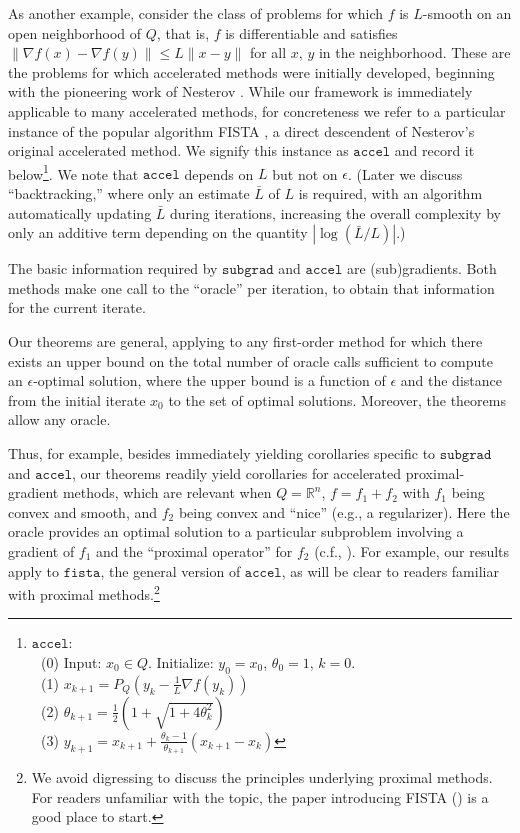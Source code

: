 \documentclass[reqno, 11pt]{amsart}
\numberwithin{equation}{section}
\newcommand{\shrink}[1]{ {\scriptstyle {\textstyle {#1} } } }
\newcommand{\smfrac}[2]{ \shrink{ \frac{#1}{#2} } }
\newcommand{\subgrad}{\mathtt{subgrad}}
\newcommand{\accel}{\mathtt{accel}}
\newcommand{\grad}{\nabla}
\begin{document}
As another example, consider the class of problems for which $ f $ is $ L $-smooth on an open neighborhood of $ Q $, that is, $ f $ is differentiable and satisfies $ \| \grad f(x) -\grad f(y) \| \leq L \| x - y \| $ for all $ x $, $ y $ in the neighborhood. These are the problems for which accelerated methods were initially developed, beginning with the pioneering work of Nesterov \cite{nesterov1983method}. While our framework is immediately applicable to many accelerated methods, for concreteness we refer to a particular instance of the popular algorithm FISTA \cite{beck2009fast}, a direct descendent of Nesterov's original accelerated method. We signify this instance as $ \accel $ and record it below\footnote{$ \accel $: \\ $ \textrm{~} $ \qquad (0)  Input: $ x_0 \in Q $. Initialize: $ y_0 = x_0 $, $ \theta_0 = 1 $, $ k = 0 $. \\
$ \textrm{~} $ \qquad (1) $ x_{k+1} = P_Q( y_k - \smfrac{1}{L}  \grad f(y_k)) $ \\
$ \textrm{~} $ \qquad (2) $ \theta_{k+1} = \smfrac{1}{2} (1 + \sqrt{1 + 4 \theta_k^2}) $ \\
$ \textrm{~} $ \qquad (3) $ y_{k+1} = x_{k+1} + \smfrac{\theta_k - 1}{\theta_{k+1}} (x_{k+1} - x_k) $ }. We note that $ \accel $  depends on $ L $ but not on $ \epsilon $. (Later we discuss ``backtracking,'' where only an estimate $ \bar{L} $ of $ L $ is required, with an algorithm automatically updating $ \bar{L} $ during iterations, increasing the overall complexity by only an additive term depending on the quantity $ | \log( \bar{L}/L ) | $.)  

The basic information required by $ \subgrad $ and $ \accel $ are (sub)gradients. Both methods make one call to the ``oracle'' per iteration, to obtain that information for the current iterate. 

Our theorems are general, applying to any first-order method for which there exists an upper bound on the total number of oracle calls sufficient to compute an $ \epsilon $-optimal solution, where the upper bound is a function of $ \epsilon $ and the distance from the initial iterate $ x_0 $ to the set of optimal solutions.  Moreover, the theorems allow any oracle. 

Thus, for example, besides immediately yielding corollaries specific to $ \subgrad $ and $ \accel $, our theorems readily yield corollaries for accelerated proximal-gradient methods, which are relevant when $ Q = \mathbb{R}^n $, $ f = f_1 + f_2 $ with $ f_1 $ being convex and smooth, and $ f_2 $ being convex and ``nice'' (e.g., a regularizer). Here the oracle provides an optimal solution to a particular subproblem involving a gradient of $ f_1 $ and the ``proximal operator'' for $ f_2 $ (c.f., \cite{nesterov2013gradient}). For example, our results apply to $ \mathtt{fista} $, the general version of $ \accel $, as will be clear to readers familiar with proximal methods.\footnote{We avoid digressing to discuss the principles underlying proximal methods.  For readers unfamiliar with the topic, the paper introducing FISTA (\cite{beck2009fast}) is a good place to start.} 
\end{document}
